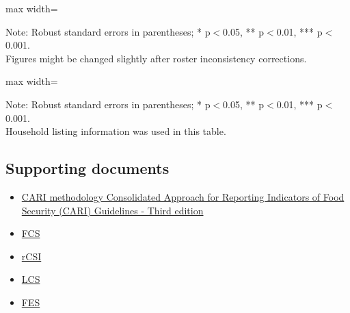 \documentclass[11pt,harvard]{article}
\begin{document}
\begin{table}[htbp]
	\centering
	\begin{adjustbox}{max width=\textwidth}
		\begin{threeparttable}
			\caption{Ecuador Sample Balance Table}
			\scriptsize
			 
			\label{tab:Ecuador_Modality_Demo_Balance}
			\begin{tablenotes}
				\item Note: Robust standard errors in parentheses; * p$<$0.05, ** p$<$0.01, *** p$<$0.001. \\
						 Figures might be changed slightly after roster inconsistency corrections.
			\end{tablenotes}
		\end{threeparttable}
	\end{adjustbox}
\end{table}

\begin{table}[htbp]
	\centering
	\begin{adjustbox}{max width=\textwidth}
		\begin{threeparttable}
			\caption{CAR Sample Balance Table}
			\scriptsize
			 
			\label{tab:CAR_Modality_Own_Phone_Demo_Balance}
			\begin{tablenotes}
				\item Note: Robust standard errors in parentheses; * p$<$0.05, ** p$<$0.01, *** p$<$0.001. \\
						 Household listing information was used in this table.
			\end{tablenotes}
		\end{threeparttable}
	\end{adjustbox}
\end{table}


\subsection{Supporting documents}

\begin{itemize}
	\item \href{https://resources.vam.wfp.org/data-analysis/quantitative/food-security/cari}{CARI methodology Consolidated Approach for Reporting Indicators of Food Security (CARI) Guidelines - Third edition}
	\item \href{https://resources.vam.wfp.org/data-analysis/quantitative/food-security/food-consumption-score}{FCS}
	\item \href{https://resources.vam.wfp.org/data-analysis/quantitative/food-security/reduced-coping-strategies-index}{rCSI}
	\item \href{https://resources.vam.wfp.org/data-analysis/quantitative/food-security/livelihood-coping-strategies-food-security}{LCS}
	\item \href{https://resources.vam.wfp.org/data-analysis/quantitative/food-security/food-expenditure-share}{FES}
\end{itemize} 
\end{document}
